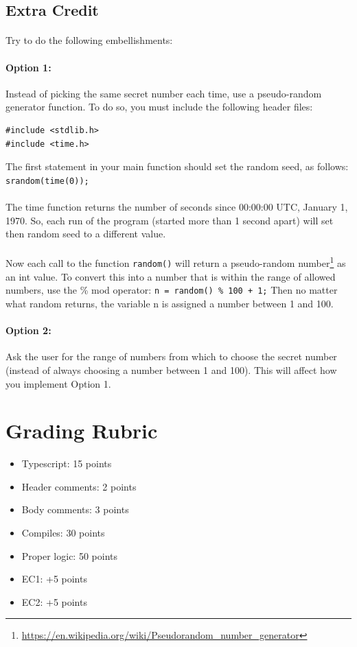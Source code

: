\documentclass[letter,11pt]{article}
\begin{document}
\subsection*{Extra Credit}
\paragraph{}Try to do the following embellishments:

\paragraph{Option 1:}Instead of picking the same secret number each time, use a pseudo-random generator function. To do so, you must include the following header files:
\begin{verbatim}
#include <stdlib.h>
#include <time.h>
\end{verbatim}
The first statement in your main function should set the random seed, as follows: \texttt{srandom(time(0));}

\paragraph{}The time function returns the number of seconds since 00:00:00 UTC, January 1, 1970. So, each run of the program (started more than 1 second apart) will set then random seed to a different value.

\paragraph{}Now each call to the function \texttt{random()} will return a pseudo-random number\footnote{\url{https://en.wikipedia.org/wiki/Pseudorandom\_number\_generator}} as an int value. To convert this into a number that is within the range of allowed numbers, use the \% mod operator: \texttt{n = random() \% 100 + 1;} Then no matter what random returns, the variable n is assigned a number between 1 and 100.

\paragraph{Option 2:}Ask the user for the range of numbers from which to choose the secret number (instead of always choosing a number between 1 and 100). This will affect how you implement Option 1.

\section*{Grading Rubric}
\begin{itemize}
    \item Typescript: 15 points
    \item Header comments: 2 points
    \item Body comments: 3 points
    \item Compiles: 30 points
    \item Proper logic: 50 points
    \item EC1: +5 points
    \item EC2: +5 points
\end{itemize}
\end{document}
